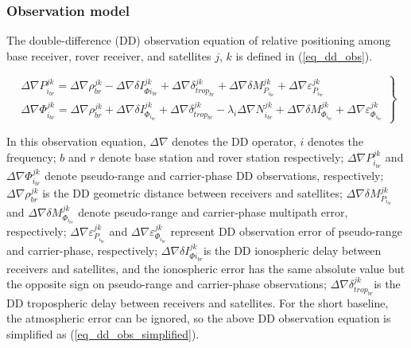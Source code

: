 \documentclass{svjour3}                     %
\begin{document}
\subsubsection{Observation model}
The double-difference (DD) observation equation of relative positioning among base receiver, rover receiver, and satellites $j$, $k$ is defined in (\ref{eq_dd_obs})\citep{teunissen2017springer}.
\begin{figure*}
	\begin{equation}
	\left. \begin{array}{l}
	\Delta \nabla P_{{i_{br}}}^{jk} = \Delta \nabla \rho _{br}^{jk} - \Delta \nabla \delta I_{\Phi {i_{br}}}^{jk} + \Delta \nabla \delta _{tro{p_{br}}}^{jk} + \Delta \nabla \delta M_{{P_{{i_{br}}}}}^{jk} + \Delta \nabla \varepsilon _{{P_{{i_{br}}}}}^{jk}\\
	\Delta \nabla \Phi _{{i_{br}}}^{jk} = \Delta \nabla \rho _{br}^{jk} + \Delta \nabla \delta I_{{\Phi _{{i_{br}}}}}^{jk} + \Delta \nabla \delta _{tro{p_{br}}}^{jk} - {\lambda _i}\Delta \nabla N_{{i_{br}}}^{jk} + \Delta \nabla \delta M_{{\Phi _{{i_{br}}}}}^{jk} + \Delta \nabla \varepsilon _{{\Phi _{{i_{br}}}}}^{jk}
	\end{array} \right\}
	\label{eq_dd_obs}
	\end{equation}
\end{figure*}
In this observation equation, $\Delta \nabla $ denotes the DD operator, $i$ denotes the frequency; $b$ and $r$ denote base station and rover station respectively; $\Delta \nabla P_{{{i}_{br}}}^{jk}$ and $\Delta \nabla \Phi _{{{i}_{br}}}^{jk}$ denote pseudo-range and carrier-phase DD observations, respectively; $\Delta \nabla \rho _{br}^{jk}$ is the DD geometric distance between receivers and satellites; $\Delta \nabla \delta M_{{{P}_{{{i}_{br}}}}}^{jk}$ and $\Delta \nabla \delta M_{{{\Phi }_{{{i}_{br}}}}}^{jk}$ denote pseudo-range and carrier-phase multipath error, respectively; $\Delta \nabla \varepsilon _{{{P}_{{{i}_{br}}}}}^{jk}$ and $\Delta \nabla \varepsilon _{{{\Phi }_{{{i}_{br}}}}}^{jk}$ represent DD observation error of pseudo-range and carrier-phase, respectively; $\Delta \nabla \delta I_{\Phi {{i}_{br}}}^{jk}$is the DD ionospheric delay between receivers and satellites, and the ionospheric error has the same absolute value but the opposite sign on pseudo-range and carrier-phase observations; $\Delta \nabla \delta _{tro{{p}_{br}}}^{jk}$is the DD tropospheric delay between receivers and satellites. For the short baseline, the atmospheric error can be ignored, so the above DD observation equation is simplified as (\ref{eq_dd_obs_simplified}).
\end{document}
